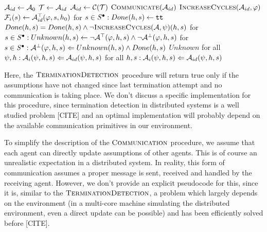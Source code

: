 \begin{algorithm}
	\begin{algorithmic}[1]
		\label{alg:main}
		\State $\mathcal{A}_{id} \gets \mathcal{A}_0$
		\Repeat
		\Repeat
		\Repeat
		\State $\mathcal{T} \gets \mathcal{A}_{id}$
		\State $\mathcal{A}_{id} \gets \mathcal{C}(\mathcal{T})$
		\State $\Call{Communicate}{\assume_{id}}$
		\State $\Call{IncreaseCycles}{\assume_{id}, \varphi}$
		\State $\mathcal{F}_i(s) \gets \mathcal{A}^\top_{id}(\varphi, s, h_0)$
		\EndFunction
			\State for $s \in \mathit{S}^\bullet : Done(h, s) \gets \texttt{tt} $
				\State $Done(h, s) = Done(h, s) \land \neg \Call{IncreaseCycles}{\mathcal{A}, \psi}(h, s)$
			\EndFor
			\State for $s \in \mathit{S}^\bullet : Unknown(h, s) \gets \neg \mathcal{A}^\top(\varphi, h, s) \land \neg \mathcal{A}^\bot(\varphi, h, s)$		
			\State for $s \in \mathit{S}^\bullet : \mathcal{A}^\bot(\varphi, h, s) \Leftarrow Unknown(h, s) \land Done(h,s)$
			\State \Return $Unknown$
		\EndFunction
					\State for all $\psi,h : \mathcal{A}_i(\psi, h, s) \Leftarrow \mathcal{A}_{id}(\psi, h, s)$
				\EndFor
					\State for all $h, s : \mathcal{A}_i(\psi, h, s) \Leftarrow \mathcal{A}_{id}(\psi, h, s)$
				\EndFor
			\EndFor
		\EndFunction
	\end{algorithmic}	
\end{algorithm}

Here, the $\textsc{TerminationDetection}$ procedure will return true only if the assumptions have not changed since last termination attempt and no communication is taking place. We don't discuss a specific implementation for this procedure, since termination detection in distributed systems is a well studied problem [CITE] and an optimal implementation will probably depend on the available communication primitives in our environment.

To simplify the description of the $\textsc{Communication}$ procedure, we assume that each agent can directly update assumptions of other agents. This is of course an unrealistic expectation in a distributed system. In reality, this form of communication assumes a proper message is sent, received and handled by the receiving agent. However, we don't provide an explicit pseudocode for this, since it is, similar to the $\textsc{TerminationDetection}$, a problem which largely depends on the environment (in a multi-core machine simulating the distributed environment, even a direct update can be possible) and has been efficiently solved before [CITE].

